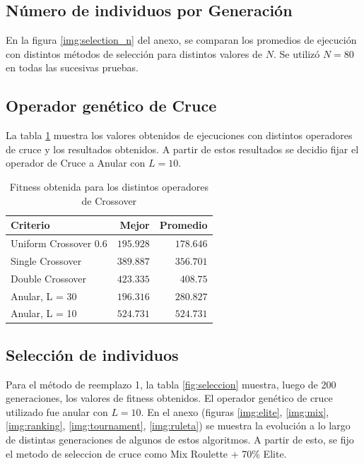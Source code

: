 \documentclass[letterpaper,twocolumn,10pt]{article}
\begin{document}
\subsection{Número de individuos por Generación}

En la figura \ref{img:selection_n} del anexo, se comparan los promedios de ejecución con
distintos métodos de selección para distintos valores de $N$. Se utilizó $N=80$ en todas
las sucesivas pruebas.

\subsection{Operador genético de Cruce}

La tabla \ref{fig:crossover} muestra los valores obtenidos de ejecuciones
con distintos operadores de cruce y los resultados obtenidos. A partir de estos resultados
se decidio fijar el operador de Cruce a Anular con $L = 10$.

\begin{table}[H]

\begin{center}
\begin{tabular}{l | r | r}
Criterio & Mejor & Promedio \\
\hline
Uniform Crossover 0.6 & $195.928$ & $178.646$ \\
Single Crossover & $389.887$ & $356.701$ \\
Double Crossover & $423.335$ & $408.75$ \\
Anular, L = 30 & $196.316$ & $280.827$ \\
Anular, L = 10 & $524.731$ & $524.731$ \\
\end{tabular}
\end{center}

\caption{Fitness obtenida para los distintos operadores de Crossover}
\label{fig:crossover}

\end{table}

\subsection{Selección de individuos}

Para el método de reemplazo 1, la tabla \ref{fig:seleccion} muestra, luego de 200
generaciones, los valores de fitness obtenidos. El operador genético de cruce utilizado
fue anular con $L=10$. En el anexo (figuras \ref{img:elite}, \ref{img:mix},
\ref{img:ranking}, \ref{img:tournament}, \ref{img:ruleta}) se muestra
la evolución a lo largo de distintas generaciones de algunos de estos algoritmos.
A partir de esto, se fijo el metodo de seleccion de cruce como Mix Roulette + 70\% Elite.
\end{document}
